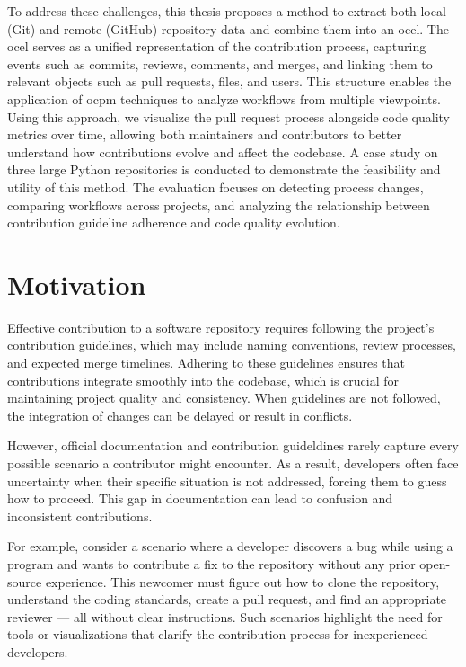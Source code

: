 To address these challenges, this thesis proposes a method to extract both local (Git) and remote (GitHub) repository data and combine them into an \ac{ocel}. The \ac{ocel} serves as a unified representation of the contribution process, capturing events such as commits, reviews, comments, and merges, and linking them to relevant objects such as pull requests, files, and users. This structure enables the application of \ac{ocpm} techniques to analyze workflows from multiple viewpoints. Using this approach, we visualize the pull request process alongside code quality metrics over time, allowing both maintainers and contributors to better understand how contributions evolve and affect the codebase. A case study on three large Python repositories is conducted to demonstrate the feasibility and utility of this method. The evaluation focuses on detecting process changes, comparing workflows across projects, and analyzing the relationship between contribution guideline adherence and code quality evolution.

\section{Motivation}
\label{sec:intro-ssec:motiv}
Effective contribution to a software repository requires following the project’s contribution guidelines, which may include naming conventions, review processes, and expected merge timelines. Adhering to these guidelines ensures that contributions integrate smoothly into the codebase, which is crucial for maintaining project quality and consistency. When guidelines are not followed, the integration of changes can be delayed or result in conflicts.

However, official documentation and contribution guideldines rarely capture every possible scenario a contributor might encounter. As a result, developers often face uncertainty when their specific situation is not addressed, forcing them to guess how to proceed. This gap in documentation can lead to confusion and inconsistent contributions.

For example, consider a scenario where a developer discovers a bug while using a program and wants to contribute a fix to the repository without any prior open-source experience. This newcomer must figure out how to clone the repository, understand the coding standards, create a pull request, and find an appropriate reviewer — all without clear instructions. Such scenarios highlight the need for tools or visualizations that clarify the contribution process for inexperienced developers.

